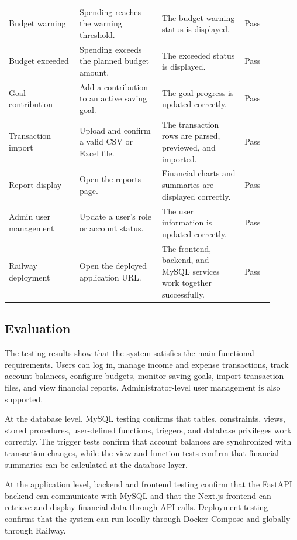 ﻿\documentclass{article}
\begin{document}
\begin{longtable}{
    >{\raggedright\arraybackslash}p{0.24\linewidth}
    J{0.28\linewidth}
    J{0.28\linewidth}
    >{\centering\arraybackslash}p{0.10\linewidth}
}
Budget warning 
& Spending reaches the warning threshold. 
& The budget warning status is displayed. 
& Pass \\

Budget exceeded 
& Spending exceeds the planned budget amount. 
& The exceeded status is displayed. 
& Pass \\

Goal contribution 
& Add a contribution to an active saving goal. 
& The goal progress is updated correctly. 
& Pass \\

Transaction import 
& Upload and confirm a valid CSV or Excel file. 
& The transaction rows are parsed, previewed, and imported. 
& Pass \\

Report display 
& Open the reports page. 
& Financial charts and summaries are displayed correctly. 
& Pass \\

Admin user management 
& Update a user's role or account status. 
& The user information is updated correctly. 
& Pass \\

Railway deployment 
& Open the deployed application URL. 
& The frontend, backend, and MySQL services work together successfully. 
& Pass \\

\end{longtable}
\normalsize

\subsection{Evaluation}

The testing results show that the system satisfies the main functional requirements. Users can log in, manage income and expense transactions, track account balances, configure budgets, monitor saving goals, import transaction files, and view financial reports. Administrator-level user management is also supported.

At the database level, MySQL testing confirms that tables, constraints, views, stored procedures, user-defined functions, triggers, and database privileges work correctly. The trigger tests confirm that account balances are synchronized with transaction changes, while the view and function tests confirm that financial summaries can be calculated at the database layer.

At the application level, backend and frontend testing confirm that the FastAPI backend can communicate with MySQL and that the Next.js frontend can retrieve and display financial data through API calls. Deployment testing confirms that the system can run locally through Docker Compose and globally through Railway.
\end{document}
